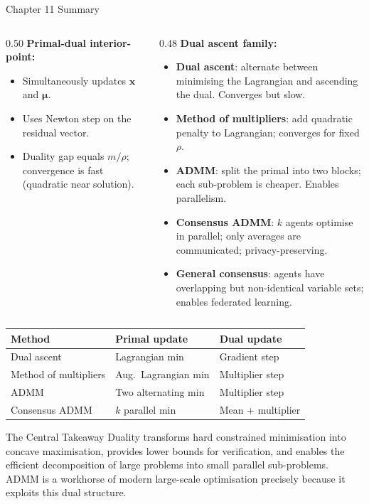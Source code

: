\documentclass[aspectratio=169,10pt]{beamer}
\newcommand{\bx}{\mathbf{x}}
\newcommand{\bmu}{\boldsymbol{\mu}}
\begin{document}
\begin{frame}[allowframebreaks]{Chapter 11 Summary}
\begin{columns}
\begin{column}{0.50\textwidth}
      \textbf{Primal-dual interior-point:}
      \begin{itemize}
        \item Simultaneously updates $\bx$ and $\bmu$.
        \item Uses Newton step on the residual vector.
        \item Duality gap equals $m/\rho$; convergence is fast
              (quadratic near solution).
      \end{itemize}
    \end{column}
    \begin{column}{0.48\textwidth}
      \textbf{Dual ascent family:}
      \begin{itemize}
        \item \textbf{Dual ascent}: alternate between minimising the
              Lagrangian and ascending the dual.  Converges but slow.
        \item \textbf{Method of multipliers}: add quadratic penalty
              to Lagrangian; converges for fixed $\rho$.
        \item \textbf{ADMM}: split the primal into two blocks; each
              sub-problem is cheaper.  Enables parallelism.
        \item \textbf{Consensus ADMM}: $k$ agents optimise in parallel;
              only averages are communicated; privacy-preserving.
        \item \textbf{General consensus}: agents have overlapping but
              non-identical variable sets; enables federated learning.
      \end{itemize}
    \end{column}
  \end{columns}

  \begin{center}
  \renewcommand{\arraystretch}{1.3}
  \begin{tabular}{lll}
    \toprule
    Method & Primal update & Dual update \\
    \midrule
    Dual ascent & Lagrangian min & Gradient step \\
    Method of multipliers & Aug.\ Lagrangian min & Multiplier step \\
    ADMM & Two alternating min & Multiplier step \\
    Consensus ADMM & $k$ parallel min & Mean + multiplier \\
    \bottomrule
  \end{tabular}
  \end{center}

  \begin{alertblock}{The Central Takeaway}
    Duality transforms hard constrained minimisation into concave
    maximisation, provides lower bounds for verification, and enables
    the efficient decomposition of large problems into small parallel
    sub-problems.  ADMM is a workhorse of modern large-scale optimisation
    precisely because it exploits this dual structure.
  \end{alertblock}

\end{frame}
\end{document}
